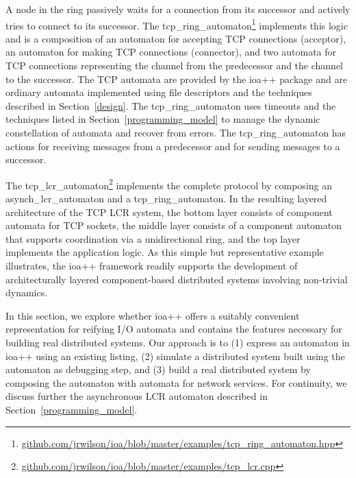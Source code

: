 A node in the ring passively waits for a connection from its successor and actively tries to connect to its successor.
The tcp\_ring\_automaton\footnote{\url{github.com/jrwilson/ioa/blob/master/examples/tcp_ring_automaton.hpp}} implements this logic and is a composition of an automaton for accepting TCP connections (acceptor), an automaton for making TCP connections (connector), and two automata for TCP connections representing the channel from the predecessor and the channel to the successor.
The TCP automata are provided by the ioa++ package and are ordinary automata implemented using file descriptors and the techniques described in Section~\ref{design}.
The tcp\_ring\_automaton uses timeouts and the techniques listed in Section~\ref{programming_model} to manage the dynamic constellation of automata and recover from errors.
The tcp\_ring\_automaton has actions for receiving messages from a predecessor and for sending messages to a successor.


The tcp\_lcr\_automaton\footnote{\url{github.com/jrwilson/ioa/blob/master/examples/tcp_lcr.cpp}} implements the complete protocol by composing an asynch\_lcr\_automaton and a tcp\_ring\_automaton.
In the resulting layered architecture of the TCP LCR system, the bottom layer consists of component automata for TCP sockets, the middle layer consists of a component automaton that supports coordination via a unidirectional ring, and the top layer implements the application logic.
As this simple but representative example illustrates, the ioa++ framework readily supports the development of architecturally layered component-based distributed systems involving non-trivial dynamics.


\ifjournal
In this section, we explore whether ioa++ offers a suitably convenient representation for reifying I/O automata and contains the features necessary for building real distributed systems.
Our approach is to (1) express an automaton in ioa++ using an existing listing, (2) simulate a distributed system built using the automaton as debugging step, and (3) build a real distributed system by composing the automaton with automata for network services.
For continuity, we discuss further the asynchronous LCR automaton described in Section~\ref{programming_model}.

